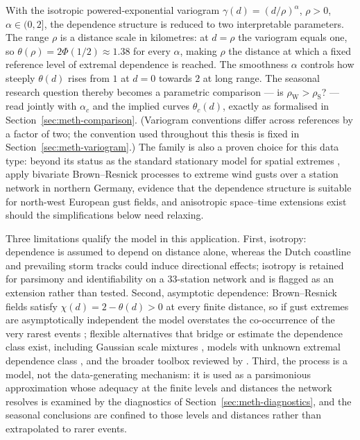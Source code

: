 With the isotropic powered-exponential variogram \(\gamma(d)=(d/\rho)^{\alpha}\), \(\rho>0\), \(\alpha\in(0,2]\), the dependence structure is reduced to two interpretable parameters. The range \(\rho\) is a distance scale in kilometres: at \(d=\rho\) the variogram equals one, so \(\theta(\rho)=2\Phi(1/2)\approx1.38\) for every \(\alpha\), making \(\rho\) the distance at which a fixed reference level of extremal dependence is reached. The smoothness \(\alpha\) controls how steeply \(\theta(d)\) rises from \(1\) at \(d=0\) towards \(2\) at long range. The seasonal research question thereby becomes a parametric comparison --- is \(\rho_{\mathrm W}>\rho_{\mathrm S}\)? --- read jointly with \(\alpha_c\) and the implied curves \(\theta_c(d)\), exactly as formalised in Section~\ref{sec:meth-comparison}. (Variogram conventions differ across references by a factor of two; the convention used throughout this thesis is fixed in Section~\ref{sec:meth-variogram}.) The family is also a proven choice for this data type: beyond its status as the standard stationary model for spatial extremes \citep{davison2012}, \citet{oesting2017} apply bivariate Brown--Resnick processes to extreme wind gusts over a station network in northern Germany, evidence that the dependence structure is suitable for north-west European gust fields, and anisotropic space--time extensions exist \citep{buhl2016} should the simplifications below need relaxing.

Three limitations qualify the model in this application. First, isotropy: dependence is assumed to depend on distance alone, whereas the Dutch coastline and prevailing storm tracks could induce directional effects; isotropy is retained for parsimony and identifiability on a \(33\)-station network and is flagged as an extension rather than tested. Second, asymptotic dependence: Brown--Resnick fields satisfy \(\chi(d)=2-\theta(d)>0\) at every finite distance, so if gust extremes are asymptotically independent the model overstates the co-occurrence of the very rarest events \citep{davison2013}; flexible alternatives that bridge or estimate the dependence class exist, including Gaussian scale mixtures \citep{huseropitzthibaud2017}, models with unknown extremal dependence class \citep{huserwadsworth2019}, and the broader toolbox reviewed by \citet{huserwadsworth2022}. Third, the process is a model, not the data-generating mechanism: it is used as a parsimonious approximation whose adequacy at the finite levels and distances the network resolves is examined by the diagnostics of Section~\ref{sec:meth-diagnostics}, and the seasonal conclusions are confined to those levels and distances rather than extrapolated to rarer events.

